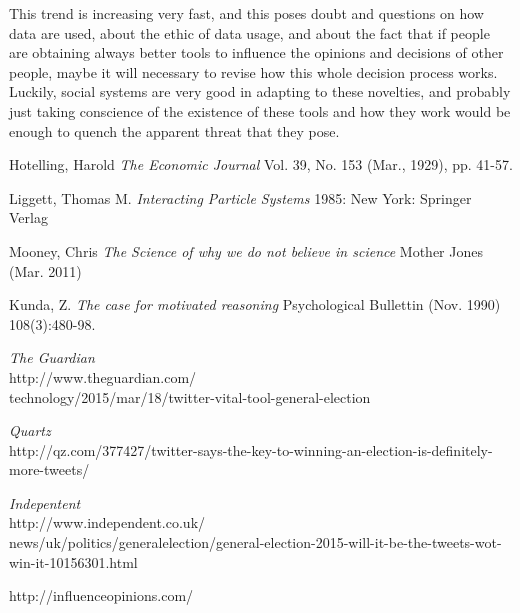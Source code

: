 \documentclass[11pt,a4paper,twocolumn]{article}
\begin{document}
This trend is increasing very fast, and this poses doubt and questions on how data are used, about the ethic of data usage, and about the fact that if people are obtaining always better tools to influence the opinions and decisions of other people, maybe it will necessary to revise how this whole decision process works.
Luckily, social systems are very good in adapting to these novelties, and probably just taking conscience of the existence of these tools and how they work would be enough to quench the apparent threat that they pose. 


\begin{thebibliography}{10}

   Hotelling, Harold {\em The Economic Journal} Vol. 39, No. 153 (Mar., 1929), pp. 41-57.

   Liggett, Thomas M. {\em Interacting Particle Systems} 1985: New York: Springer Verlag

   Mooney, Chris {\em The Science of why we do not believe in science} Mother Jones (Mar. 2011)
  
   Kunda, Z. {\em The case for motivated reasoning} Psychological Bullettin (Nov. 1990) 108(3):480-98.

   {\em The Guardian}\\ http://www.theguardian.com/\\technology/2015/mar/18/twitter-vital-tool-general-election
  
   {\em Quartz}\\ http://qz.com/377427/twitter-says-the-key-to-winning-an-election-is-definitely-more-tweets/

   {\em Indepentent}\\ http://www.independent.co.uk/\\news/uk/politics/generalelection/general-election-2015-will-it-be-the-tweets-wot-win-it-10156301.html
  
   http://influenceopinions.com/
  
\end{thebibliography}
\end{document}

